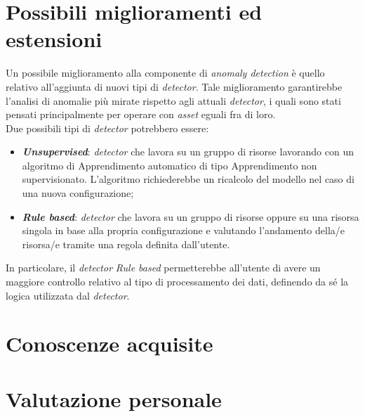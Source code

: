 \section{Possibili miglioramenti ed estensioni}
Un possibile miglioramento alla componente di \textit{anomaly detection} è quello relativo all'aggiunta di nuovi tipi di \textit{detector}. Tale miglioramento garantirebbe l'analisi di anomalie più mirate rispetto agli attuali \textit{detector}, i quali sono stati pensati principalmente per operare con \textit{asset} eguali fra di loro.\\
Due possibili tipi di \textit{detector} potrebbero essere:
\begin{itemize}
	\item{\textbf{\textit{Unsupervised}}: \textit{detector} che lavora su un gruppo di risorse lavorando con un algoritmo di \gls{Apprendimento automatico} di tipo \gls{Apprendimento non supervisionato}. L'algoritmo richiederebbe un ricalcolo del modello nel caso di una nuova configurazione;}
	\item{\textbf{\textit{Rule based}}: \textit{detector} che lavora su un gruppo di risorse oppure su una risorsa singola in base alla propria configurazione e valutando l'andamento della/e risorsa/e tramite una regola definita dall'utente.}
\end{itemize}
In particolare, il \textit{detector} \textit{Rule based} permetterebbe all'utente di avere un maggiore controllo relativo al tipo di processamento dei dati, definendo da sé la logica utilizzata dal \textit{detector}.



\section{Conoscenze acquisite}

\section{Valutazione personale}
